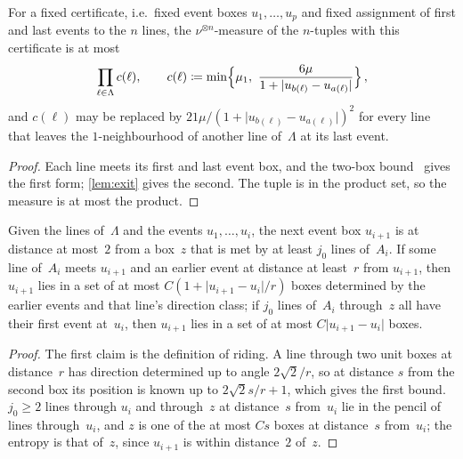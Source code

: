 \documentclass[11pt,letterpaper]{article}
\begin{document}
\begin{lemma}
\label{lem:measure}
For a fixed certificate, i.e.\ fixed event boxes $u_1,\dots,u_p$ and fixed assignment of first and last events to the $n$ lines, the $\nu^{\otimes n}$-measure of the $n$-tuples with this certificate is at most
\begin{equation}
\label{eq:measurecert}
  \prod_{\ell\in\Lambda}c(\ell),\qquad c(\ell)\coloneqq\min\Bigl\{\mu_1,\ \frac{6\mu}{1+\lvert u_{b(\ell)}-u_{a(\ell)}\rvert}\Bigr\}\,,
\end{equation}
and $c(\ell)$ may be replaced by $21\mu/(1+\lvert u_{b(\ell)}-u_{a(\ell)}\rvert)^2$ for every line that leaves the $1$-neighbourhood of another line of~$\Lambda$ at its last event.
\end{lemma}

\begin{proof}
Each line meets its first and last event box, and the two-box bound~\cite[Lemma~3.2]{HJ26b} gives the first form; \cref{lem:exit} gives the second. The tuple is in the product set, so the measure is at most the product.
\end{proof}

\begin{lemma}
\label{lem:entropy}
Given the lines of~$\Lambda$ and the events $u_1,\dots,u_i$, the next event box $u_{i+1}$ is at distance at most~$2$ from a box~$z$ that is met by at least $j_0$ lines of~$A_i$. If some line of~$A_i$ meets $u_{i+1}$ and an earlier event at distance at least~$r$ from $u_{i+1}$, then $u_{i+1}$ lies in a set of at most $C(1+\lvert u_{i+1}-u_i\rvert/r)$ boxes determined by the earlier events and that line's direction class; if $j_0$ lines of~$A_i$ through~$z$ all have their first event at~$u_i$, then $u_{i+1}$ lies in a set of at most $C\lvert u_{i+1}-u_i\rvert$ boxes.
\end{lemma}

\begin{proof}
The first claim is the definition of riding. A line through two unit boxes at distance~$r$ has direction determined up to angle $2\sqrt2/r$, so at distance $s$ from the second box its position is known up to $2\sqrt2s/r+1$, which gives the first bound. $j_0\ge2$ lines through $u_i$ and through~$z$ at distance~$s$ from~$u_i$ lie in the pencil of lines through~$u_i$, and $z$ is one of the at most $Cs$ boxes at distance~$s$ from~$u_i$; the entropy is that of~$z$, since $u_{i+1}$ is within distance~$2$ of~$z$.
\end{proof}
\end{document}

